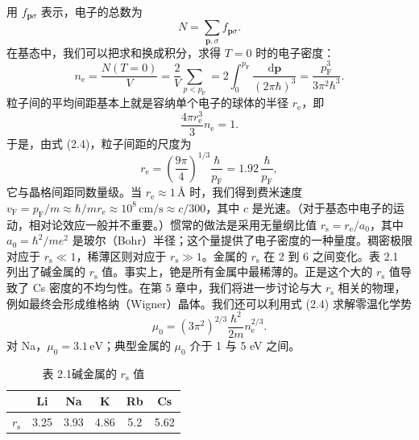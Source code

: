 用 $f_{\mathbf{p}\sigma}$ 表示，电子的总数为
\begin{equation*}
N=\sum_{\mathbf{p},\sigma}f_{\mathbf{p}\sigma}.
\tag{2.3}
\end{equation*}
在基态中，我们可以把求和换成积分，求得 $T=0$ 时的电子密度：
\begin{equation*}
n_{\mathrm{e}}=\frac{N(T=0)}{V}=\frac{2}{V}\sum_{p<p_{\mathrm{F}}}=2\int_{0}^{p_{\mathrm{F}}}\frac{\mathrm{d}\mathbf{p}}{(2\pi\hbar)^{3}}=\frac{p_{\mathrm{F}}^{3}}{3\pi^{2}\hbar^{3}}.
\tag{2.4}
\end{equation*}
粒子间的平均间距基本上就是容纳单个电子的球体的半径 $r_{\mathrm{e}}$，即
\begin{equation*}
\frac{4\pi r_{\mathrm{e}}^{3}}{3}n_{\mathrm{e}}=1.
\tag{2.5}
\end{equation*}
于是，由式 (2.4)，粒子间距的尺度为
\begin{equation*}
r_{\mathrm{e}}=\left(\frac{9\pi}{4}\right)^{1/3}\frac{\hbar}{p_{\mathrm{F}}}=1.92\,\frac{\hbar}{p_{\mathrm{F}}},
\tag{2.6}
\end{equation*}
它与晶格间距同数量级。当 $r_{\mathrm{e}}\approx 1\,\text{\AA}$ 时，我们得到费米速度 $v_{\mathrm{F}}=p_{\mathrm{F}}/m\approx\hbar/mr_{\mathrm{e}}\approx 10^{8}\,\mathrm{cm/s}\approx c/300$，其中 $c$ 是光速。（对于基态中电子的运动，相对论效应一般并不重要。）惯常的做法是采用无量纲比值 $r_{\mathrm{s}}=r_{\mathrm{e}}/a_{0}$，其中 $a_{0}=\hbar^{2}/me^{2}$ 是玻尔（Bohr）半径；这个量提供了电子密度的一种量度。稠密极限对应于 $r_{\mathrm{s}}\ll 1$，稀薄区则对应于 $r_{\mathrm{s}}\gg 1$。金属的 $r_{\mathrm{s}}$ 在 2 到 6 之间变化。表 2.1 列出了碱金属的 $r_{\mathrm{s}}$ 值。事实上，铯是所有金属中最稀薄的。正是这个大的 $r_{\mathrm{s}}$ 值导致了 Cs 密度的不均匀性。在第 5 章中，我们将进一步讨论与大 $r_{\mathrm{s}}$ 相关的物理，例如最终会形成维格纳（Wigner）晶体。我们还可以利用式 (2.4) 求解零温化学势
\begin{equation*}
\mu_{0}=(3\pi^{2})^{2/3}\frac{\hbar^{2}}{2m}n_{\mathrm{e}}^{2/3}.
\tag{2.7}
\end{equation*}
对 Na，$\mu_{0}=3.1\,\mathrm{eV}$；典型金属的 $\mu_{0}$ 介于 1 与 5 eV 之间。

\begin{table}[H]
\centering
\caption*{表 2.1\quad 碱金属的 $r_{\mathrm{s}}$ 值}
\begin{tabular}{lccccc}
\toprule
 & Li & Na & K & Rb & Cs\\
\midrule
$r_{\mathrm{s}}$ & 3.25 & 3.93 & 4.86 & 5.2 & 5.62\\
\bottomrule
\end{tabular}
\end{table}

